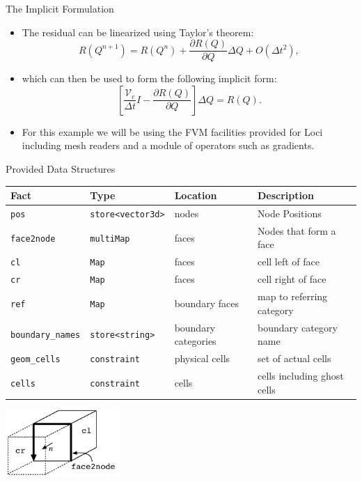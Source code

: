 \documentclass{beamer}
\begin{document}
\begin{frame}{The Implicit Formulation}
\begin{itemize}
\item The residual can be linearized using Taylor's theorem:
\begin{equation*}
R(Q^{n+1}) = R(Q^n) + \frac{\partial R(Q)}{\partial Q} \Delta Q +
O(\Delta t^2),
\end{equation*}
\item which can then be used to form the following implicit form:
\begin{equation*}
\left[ \frac{\mathcal{V}_c}{\Delta t} I - \frac{\partial R(Q)}{\partial Q}\right]\Delta Q =
R(Q).
\end{equation*}
\item For this example we will be using the FVM facilities provided for Loci including mesh readers and a module of operators such as gradients.
\end{itemize}
\end{frame}
\begin{frame}{Provided Data Structures}
\tiny
\begin{center}
  \begin{tabular}{|l|l|l|l|}
    \hline
    Fact  & Type & Location & Description\\
    \hline\hline
    {\tt pos} & {\tt store<vector3d>} & nodes & Node Positions\\
    {\tt face2node} & {\tt multiMap} & faces & Nodes that form a
    face\\
    {\tt cl} & {\tt Map} & faces & cell left of face\\
    {\tt cr} & {\tt Map} & faces & cell right of face\\
    {\tt ref} & {\tt Map} & boundary faces & map to referring category\\
    {\tt boundary\_names} & {\tt store<string>} & boundary categories & boundary category name\\
    {\tt geom\_cells} & {\tt constraint} & physical cells & set of actual cells\\
{\tt cells} & {\tt constraint} & cells & cells including ghost cells\\
    \hline
  \end{tabular}
\end{center}
\begin{center}
\includegraphics[height=1in]{Figures/face}
\end{center}
\end{frame}
\end{document}
